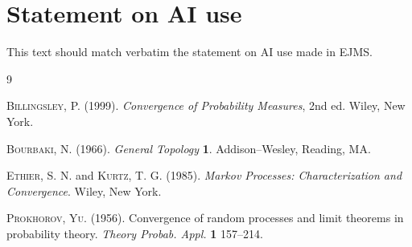 \documentclass[ps]{imsart}
\theoremstyle{plain}
\theoremstyle{definition}
\theoremstyle{remark}
\begin{document}
\section*{Statement on AI use}
This text should match verbatim the statement on AI use made in EJMS.


\begin{thebibliography}{9}

\textsc{Billingsley, P.} (1999). \textit{Convergence of
Probability Measures}, 2nd ed.
Wiley, New York.

\textsc{Bourbaki, N.}  (1966). \textit{General Topology}  \textbf{1}.
Addison--Wesley, Reading, MA.

\textsc{Ethier, S. N.} and \textsc{Kurtz, T. G.} (1985).
\textit{Markov Processes: Characterization and Convergence}.
Wiley, New York.

\textsc{Prokhorov, Yu.} (1956).
Convergence of random processes and limit theorems in probability
theory. \textit{Theory  Probab.  Appl.}
\textbf{1} 157--214.
\end{thebibliography}
\end{document}
